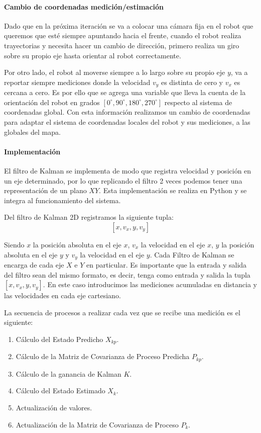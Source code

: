 \paragraph{Cambio de coordenadas medición/estimación} \mbox{} \vspace{10pt}

Dado que en la próxima iteración se va a colocar una cámara fija en el robot que queremos que esté siempre apuntando hacia el frente, cuando el robot realiza trayectorias y necesita hacer un cambio de dirección, primero realiza un giro sobre su propio eje hasta orientar al robot correctamente.

Por otro lado, el robot al moverse siempre a lo largo sobre su propio eje $y$, va a reportar siempre mediciones donde la velocidad $v_y$ es distinta de cero y $v_x$ es cercana a cero. Es por ello que se agrega una variable que lleva la cuenta de la orientación del robot en grados $[0^{\circ}, 90^{\circ}, 180^{\circ}, 270^{\circ}]$ respecto al sistema de coordenadas global. Con esta información realizamos un cambio de coordenadas para adaptar el sistema de coordenadas locales del robot y sus mediciones, a las globales del mapa.

\paragraph{Implementación} \mbox{} \vspace{10pt}

El filtro de Kalman se implementa de modo que registra velocidad y posición en un eje determinado, por lo que replicando el filtro 2 veces podemos tener una representación de un plano $XY$. Esta implementación se realiza en Python y se integra al funcionamiento del sistema.

Del filtro de Kalman 2D registramos la siguiente tupla:
$$ [x, v_x, y, v_y] $$

Siendo $x$ la posición absoluta en el eje $x$, $v_x$ la velocidad en el eje $x$, $y$ la posición absoluta en el eje $y$ y $v_y$ la velocidad en el eje $y$. Cada Filtro de Kalman se encarga de cada eje $X$ e $Y$ en particular.
Es importante que la entrada y salida del filtro sean del mismo formato, es decir, tenga como entrada y salida la tupla $[x, v_x, y, v_y]$. En este caso introducimos las mediciones acumuladas en distancia y las velocidades en cada eje cartesiano.

La secuencia de procesos a realizar cada vez que se recibe una medición es el siguiente:
\begin{enumerate}
    \item Cálculo del Estado Predicho $X_{kp}$.
    \item Cálculo de la Matriz de Covarianza de Proceso Predicha $P_{kp}$.
    \item Cálculo de la ganancia de Kalman $K$.
    \item Cálculo del Estado Estimado $X_k$.
    \item Actualización de valores.
    \item Actualización de la Matriz de Covarianza de Proceso $P_k$.
\end{enumerate}

